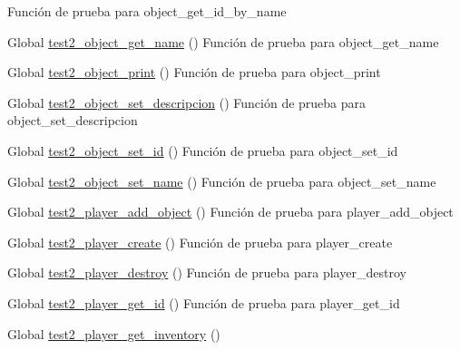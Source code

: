 \begin{DoxyRefList}
%
Función de prueba para object\+\_\+get\+\_\+id\+\_\+by\+\_\+name  
\item[Global \mbox{\hyperlink{object__test_8c_abdfafbc7b8588d3dcdb05fd2beb2397e}{test2\+\_\+object\+\_\+get\+\_\+name}} ()]\label{test__test000113}%
%
Función de prueba para object\+\_\+get\+\_\+name  
\item[Global \mbox{\hyperlink{object__test_8c_a57499e0ae8248f1182072920b47add5e}{test2\+\_\+object\+\_\+print}} ()]\label{test__test000123}%
%
Función de prueba para object\+\_\+print  
\item[Global \mbox{\hyperlink{object__test_8c_a480fb1c8e446c7b2aca2f65c04c640d0}{test2\+\_\+object\+\_\+set\+\_\+descripcion}} ()]\label{test__test000117}%
%
Función de prueba para object\+\_\+set\+\_\+descripcion  
\item[Global \mbox{\hyperlink{object__test_8c_a1f0cfd69428a6cf954fe37c9c21f8cb3}{test2\+\_\+object\+\_\+set\+\_\+id}} ()]\label{test__test000111}%
%
Función de prueba para object\+\_\+set\+\_\+id  
\item[Global \mbox{\hyperlink{object__test_8c_acf42b7e7be91ede243f2aaa56c4c9347}{test2\+\_\+object\+\_\+set\+\_\+name}} ()]\label{test__test000108}%
%
Función de prueba para object\+\_\+set\+\_\+name  
\item[Global \mbox{\hyperlink{player__test_8c_a864d3935cf61953950b10df0e656306d}{test2\+\_\+player\+\_\+add\+\_\+object}} ()]\label{test__test000139}%
%
Función de prueba para player\+\_\+add\+\_\+object  
\item[Global \mbox{\hyperlink{player__test_8c_a4f6eca5f9d8c08d2a7fc70c209ecf854}{test2\+\_\+player\+\_\+create}} ()]\label{test__test000125}%
%
Función de prueba para player\+\_\+create  
\item[Global \mbox{\hyperlink{player__test_8c_ae873be01647faf96d3906aa9629e87f0}{test2\+\_\+player\+\_\+destroy}} ()]\label{test__test000127}%
%
Función de prueba para player\+\_\+destroy  
\item[Global \mbox{\hyperlink{player__test_8c_a9fa80f0c0e46b45eb9f1685b102a5826}{test2\+\_\+player\+\_\+get\+\_\+id}} ()]\label{test__test000135}%
%
Función de prueba para player\+\_\+get\+\_\+id  
\item[Global \mbox{\hyperlink{player__test_8c_a8f3a62c708fbed848568841ca8b1cd26}{test2\+\_\+player\+\_\+get\+\_\+inventory}} ()]\label{test__test000153}%

\end{DoxyRefList}
